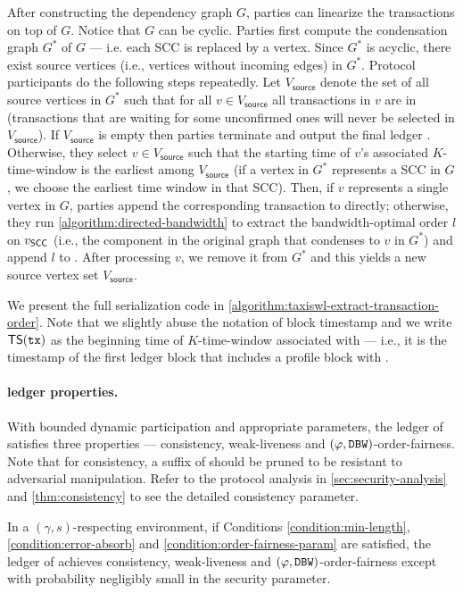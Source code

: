 After constructing the dependency graph $G$, parties can linearize the transactions on top of $G$.
%
Notice that $G$ can be cyclic. Parties first compute the condensation graph $G^*$ of $G$ --- i.e. each SCC is replaced by a vertex.
%
Since $G^*$ is acyclic, there exist source vertices (i.e., vertices without incoming edges) in $G^*$.
%
Protocol participants do the following steps repeatedly.
%
Let $V_{\mathsf{source}}$ denote the set of all source vertices in $G^*$ such that for all $v \in V_{\mathsf{source}}$ all transactions in $v$ are in \txpool (transactions that are waiting for some unconfirmed ones will never be selected in $V_{\mathsf{source}}$).
%
If $V_{\mathsf{source}}$ is empty then parties terminate and output the final ledger \ledger.
%
Otherwise, they select $v \in V_{\mathsf{source}}$ such that the starting time of $v$'s associated $K$-time-window is the earliest among $V_{\mathsf{source}}$ (if a vertex in $G^*$ represents a SCC in $G$, we choose the earliest time window in that SCC).
%
Then, if $v$ represents a single vertex in $G$, parties append the corresponding transaction to \ledger directly; otherwise, they run \cref{algorithm:directed-bandwidth} to extract the bandwidth-optimal order $l$ on $v_\mathsf{SCC}$ (i.e., the component in the original graph that condenses to $v$ in $G^*$) and append $l$ to \ledger.
%
After processing $v$, we remove it from $G^*$ and this yields a new source vertex set $V_{\mathsf{source}}$.

We present the full serialization code in \cref{algorithm:taxiswl-extract-transaction-order}.
%
Note that we slightly abuse the notation of block timestamp and we write $\mathsf{TS}(\mathtt{tx})$ as the beginning time of $K$-time-window associated with \tx --- i.e., it is the timestamp of the first ledger block \LB that includes a profile block with \tx.



\paragraph{\TaxisWL ledger properties.}
%
With bounded dynamic participation and appropriate parameters, the ledger \ledger of \TaxisWL satisfies three properties --- consistency, weak-liveness and  $(\varphi, \mathtt{DBW})$-order-fairness.
%
Note that for consistency, a suffix of \ledger should be pruned to be resistant to adversarial manipulation.
%
Refer to the protocol analysis in \cref{sec:security-analysis} and \cref{thm:consistency} to see the detailed consistency parameter.

\begin{theorem}[Informal]
    In a $(\gamma, s)$-respecting environment, if Conditions \eqref{condition:min-length}, \eqref{condition:error-absorb} and \eqref{condition:order-fairness-param} are satisfied, the ledger \ledger of \TaxisWL achieves consistency, weak-liveness and $(\varphi, \mathtt{DBW})$-order-fairness except with probability negligibly small in the security parameter.
\end{theorem}
